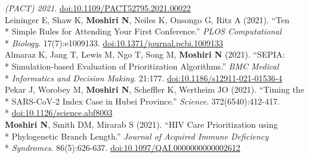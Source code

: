 \documentclass[margin,line]{res}
\begin{document}
\begin{resume}
\hspace*{8mm} \textit{(PACT) 2021}. \href{https://doi.org/10.1109/PACT52795.2021.00022}{doi:10.1109/PACT52795.2021.00022}\\
\hspace*{4mm} Leininger E, Shaw K, \textbf{Moshiri N}, Neiles K, Onsongo G, Ritz A (2021). ``Ten\\*
\hspace*{9mm} Simple Rules for Attending Your First Conference.'' \textit{PLOS Computational}\\*\vspace{2mm}
\hspace*{8mm} \textit{Biology}. 17(7):e1009133. \href{https://doi.org/10.1371/journal.pcbi.1009133}{doi:10.1371/journal.pcbi.1009133}\\
\hspace*{4mm} Almaraz K, Jang T, Lewis M, Ngo T, Song M, \textbf{Moshiri N} (2021). ``SEPIA:\\*
\hspace*{9mm} Simulation-based Evaluation of Prioritization Algorithms.'' \textit{BMC Medical}\\*\vspace{2mm}
\hspace*{8mm} \textit{Informatics and Decision Making}. 21:177. \href{https://doi.org/10.1186/s12911-021-01536-4}{doi:10.1186/s12911-021-01536-4}\\
\hspace*{4mm} Pekar J, Worobey M, \textbf{Moshiri N}, Scheffler K, Wertheim JO (2021). ``Timing the\\*
\hspace*{9mm} SARS-CoV-2 Index Case in Hubei Province.'' \textit{Science}. 372(6540):412-417.\\*\vspace{2mm}
\hspace*{8mm} \href{https://doi.org/10.1126/science.abf8003}{doi:10.1126/science.abf8003}\\
\hspace*{4mm} \textbf{Moshiri N}, Smith DM, Mirarab S (2021). ``HIV Care Prioritization using\\*
\hspace*{9mm} Phylogenetic Branch Length.'' \textit{Journal of Acquired Immune Deficiency}\\*\vspace{2mm}
\hspace*{8mm} \textit{Syndromes}. 86(5):626-637. \href{https://doi.org/10.1097/QAI.0000000000002612}{doi:10.1097/QAI.0000000000002612}\\

\end{resume}
\end{document}
